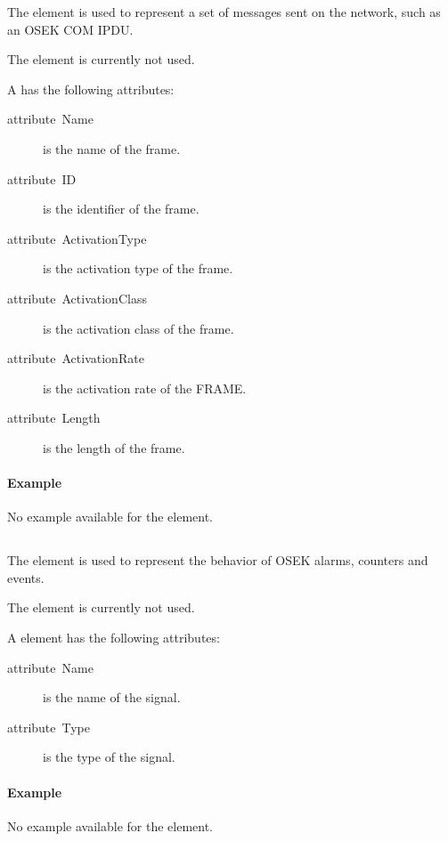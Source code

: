 The  element is used to represent a set of messages sent
on the network, such as an OSEK COM IPDU.

The  element is currently not used.

A  has the following attributes:
\begin{description}
\item [{attribute~Name}] is the name of the frame.
\item [{attribute~ID}] is the identifier of the frame.
\item [{attribute~ActivationType}] is the activation type of the frame.
\item [{attribute~ActivationClass}] is the activation class of the frame.
\item [{attribute~ActivationRate}] is the activation rate of the FRAME.
\item [{attribute~Length}] is the length of the frame.
\end{description}

\paragraph{Example}

No example available for the  element.


\subsection{}

The  element is used to represent the behavior of OSEK
alarms, counters and events.

The  element is currently not used.

A  element has the following attributes:
\begin{description}
\item [{attribute~Name}] is the name of the signal.
\item [{attribute~Type}] is the type of the signal.
\end{description}

\paragraph{Example}

No example available for the  element.


\subsection{}

